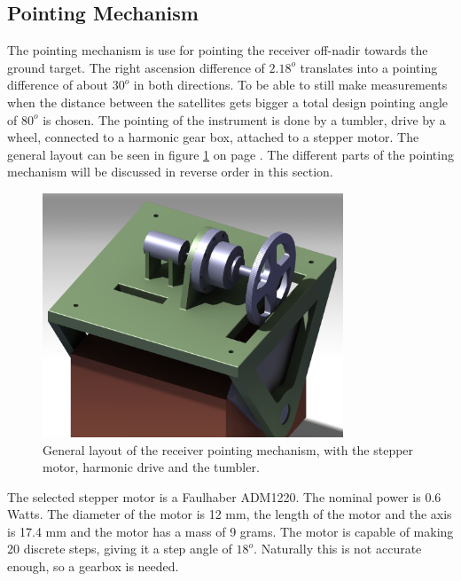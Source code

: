 
\subsection{Pointing Mechanism}
\label{subsec:point}
The pointing mechanism is use for pointing the receiver off-nadir towards the ground target. The right ascension difference of $2.18^o$ translates into a pointing difference of about $30^o$ in both directions. To be able to still make measurements when the distance between the satellites gets bigger a total design pointing angle of $80^o$ is chosen. The pointing of the instrument is done by a tumbler, drive by a wheel, connected to a harmonic gear box, attached to a stepper motor. The general layout can be seen in figure \ref{fig:point} on page \pageref{fig:point}. The different parts of the pointing mechanism will be discussed in reverse order in this section.

\begin{figure} [h]
\centering
\includegraphics[width=0.8\textwidth, bb=0 0 895px 756px]{chapters/img/point_setup.png}
\caption[General layout of the receiver pointing mechanism]{General layout of the receiver pointing mechanism, with the stepper motor, harmonic drive and the tumbler.}
\label{fig:point}
\end{figure}

The selected stepper motor is a Faulhaber ADM1220. The nominal power is 0.6 Watts. The diameter of the motor is 12 mm, the length of the motor and the axis is 17.4 mm and the motor has a mass of 9 grams. The motor is capable of making 20 discrete steps, giving it a step angle of $18^o$. Naturally this is not accurate enough, so a gearbox is needed.

